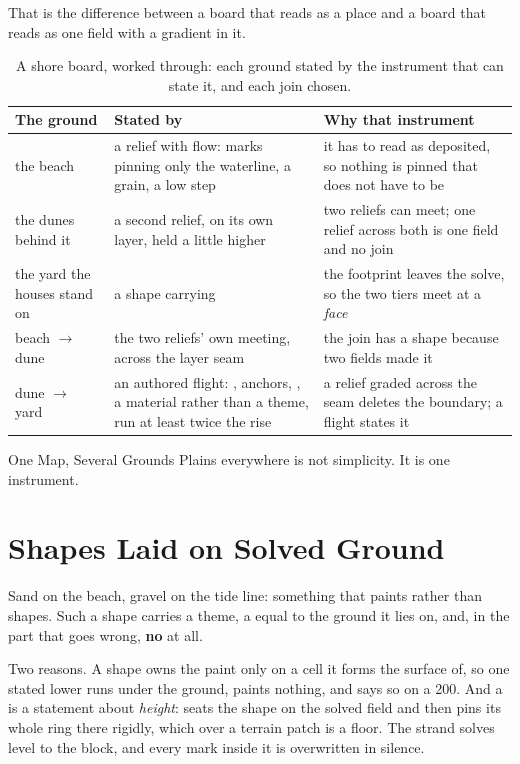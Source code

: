 That is the difference between a board that reads as a place and a board that
reads as one field with a gradient in it.

\begin{table}[htbp]
\caption{A shore board, worked through: each ground stated by the instrument that
can state it, and each join chosen.}
\label{tab:shore}
\small
\begin{tabularx}{\textwidth}{L{3.1cm} L{4.1cm} Y}
\toprule
\textbf{The ground} & \textbf{Stated by} & \textbf{Why that instrument} \\
\midrule
the beach & a relief with flow: marks pinning only the waterline, a grain, a low
  step & it has to read as deposited, so nothing is pinned that does not have to be \\
the dunes behind it & a second relief, on its own layer, held a little higher &
  two reliefs can meet; one relief across both is one field and no join \\
the yard the houses stand on & a shape carrying  &
  the footprint leaves the solve, so the two tiers meet at a \emph{face} \\
beach $\rightarrow$ dune & the two reliefs' own meeting, across the layer seam &
  the join has a shape because two fields made it \\
dune $\rightarrow$ yard & an authored flight: ,
  anchors, , a material rather than a theme, run at least twice the
  rise & a relief graded across the seam deletes the boundary; a flight states it \\
\bottomrule
\end{tabularx}
\end{table}

\begin{ruling}{One Map, Several Grounds}
Plains everywhere is not simplicity. It is one instrument.
\end{ruling}

\section{Shapes Laid on Solved Ground}

Sand on the beach, gravel on the tide line: something that paints rather than
shapes. Such a shape carries a theme, a  equal to the ground it
lies on, and, in the part that goes wrong, \textbf{no}  at all.

Two reasons. A shape owns the paint only on a cell it forms the surface of, so one
stated lower runs under the ground, paints nothing, and says so on a 200. And a
 is a statement about \emph{height}:  seats the shape
on the solved field and then pins its whole ring there rigidly, which over a
terrain patch is a floor. The strand solves level to the block, and every mark
inside it is overwritten in silence.

